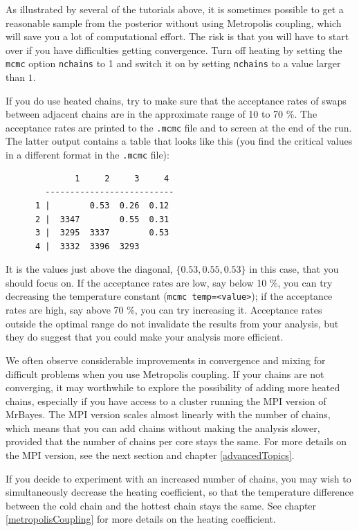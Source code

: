 \documentclass[12pt]{book}
\newcommand{\ttt}[1]{\texttt{#1}}
\begin{document}
As illustrated by several of the tutorials above, it is sometimes possible to get a reasonable
sample from the posterior without using Metropolis coupling, which will save you a lot of
computational effort. The risk is that you will have to start over if you have difficulties getting
convergence. Turn off heating by setting the \ttt{mcmc} option \ttt{nchains} to 1 and switch it on
by setting \ttt{nchains} to a value larger than $1$.

If you do use heated chains, try to make sure that the acceptance rates of swaps between adjacent
chains are in the approximate range of 10 to 70 \%. The acceptance rates are printed to the
\ttt{.mcmc} file and to screen at the end of the run. The latter output contains a table that
looks like this (you find the critical values in a different format in the \ttt{.mcmc} file):

\footnotesize
\begin{singlespacing}
\begin{verbatim}
              1     2     3     4 
        --------------------------
      1 |        0.53  0.26  0.12 
      2 |  3347        0.55  0.31 
      3 |  3295  3337        0.53 
      4 |  3332  3396  3293       
\end{verbatim}
\end{singlespacing}
\normalsize

It is the values just above the diagonal, $\{0.53, 0.55, 0.53\}$ in this case, that you should
focus on. If the acceptance rates are low, say below 10 \%, you can try decreasing the temperature
constant (\ttt{mcmc temp=<value>}); if the acceptance rates are high, say above 70 \%, you can
try increasing it. Acceptance rates outside the optimal range do not invalidate the results from
your analysis, but they do suggest that you could make your analysis more efficient.

We often observe considerable improvements in convergence and mixing for difficult problems when
you use Metropolis coupling. If your chains are not converging, it may worthwhile to explore the
possibility of adding more heated chains, especially if you have access to a cluster running the
MPI version of MrBayes. The MPI version scales almost linearly with the number of chains, which
means that you can add chains without making the analysis slower, provided that the number of
chains per core stays the same. For more details on the MPI version, see the next section and
chapter \ref{advancedTopics}.

If you decide to experiment with an increased number of chains, you may wish to simultaneously
decrease the heating coefficient, so that the temperature difference between the cold chain and the
hottest chain stays the same. See chapter \ref{metropolisCoupling} for more details on the heating
coefficient.
\end{document}
